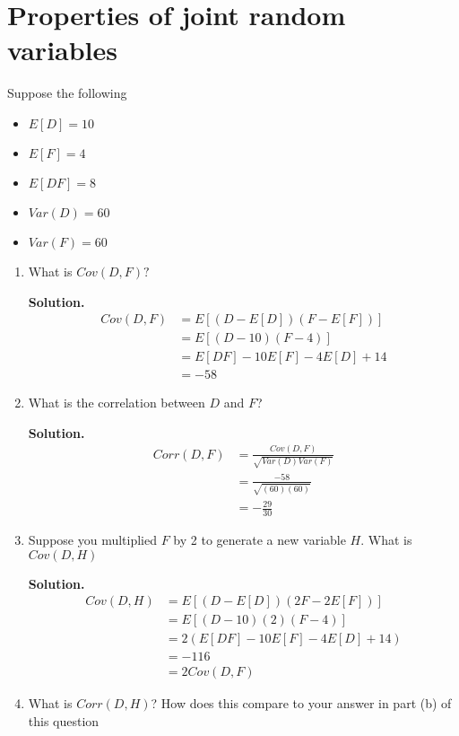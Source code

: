 \documentclass[12pt]{article}
\begin{document}
\section{Properties of joint random variables}

Suppose the following 
\begin{itemize}
    \item $E[D]=10$
    \item $E[F]=4$
    \item $E[DF] = 8$
    \item $Var(D)= 60$
    \item $Var(F) = 60$
\end{itemize}
\begin{enumerate}
    \item What is $Cov(D,F)?$

    \textbf{Solution.}
    \begin{align*}
        Cov(D,F) &= E[(D-E[D])(F-E[F])]
        \\ &= E[(D-10)(F-4)]
        \\ &= E[DF] - 10E[F]- 4E[D]+14 
        \\ &= -58
    \end{align*}

    \item What is the correlation between $D$ and $F$?

    \textbf{Solution.}
    \begin{align*}
        Corr(D,F) &= \frac{Cov(D,F)}{\sqrt{Var(D)Var(F)}}
        \\ &= \frac{-58}{\sqrt{(60)(60)}}
        \\ &= -\frac{29}{30}
    \end{align*}

    \item Suppose you multiplied $F$ by 2 to generate a new variable $H$. What is $Cov(D,H)$

    \textbf{Solution.}
    \begin{align*}
        Cov(D,H) &= E[(D-E[D])(2F-2E[F])]
        \\ &= E[(D-10)(2)(F-4)]
        \\ &= 2(E[DF] - 10E[F]- 4E[D]+14)
        \\ &= -116
        \\ &= 2Cov(D,F)
    \end{align*}

    \item What is $Corr(D,H)$? How does this compare to your answer in part (b) of this question


\end{enumerate}
\end{document}
